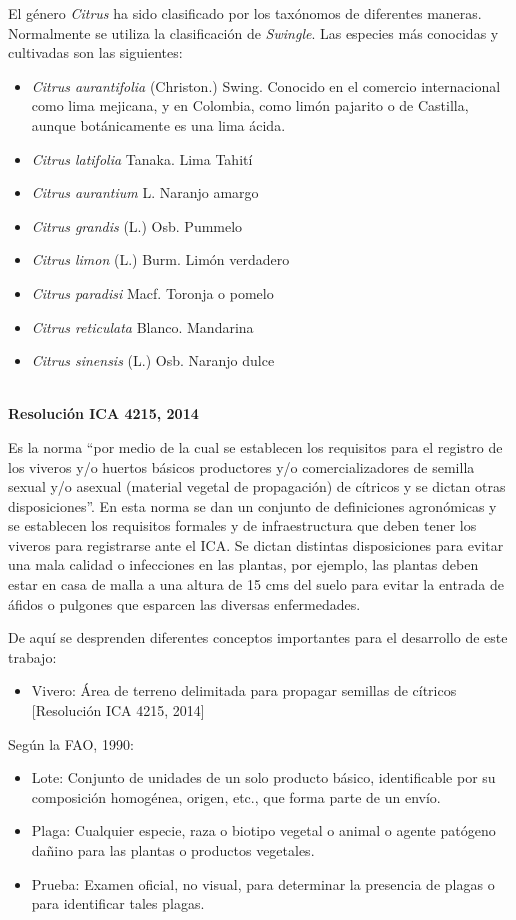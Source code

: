El g\'{e}nero \textit{Citrus} ha sido clasificado por los tax\'{o}nomos de diferentes maneras. Normalmente se utiliza la clasificaci\'{o}n de \textit{Swingle}. Las especies m\'{a}s conocidas y cultivadas son las siguientes: 
\begin{itemize}
\item \textit{Citrus aurantifolia} (Christon.) Swing. Conocido en el comercio internacional como lima mejicana, y en Colombia, como lim\'{o}n pajarito o de Castilla, aunque bot\'{a}nicamente es una lima \'{a}cida.
\item \textit{Citrus latifolia} Tanaka. Lima Tahit\'{i}
\item \textit{Citrus aurantium} L. Naranjo amargo
\item \textit{Citrus grandis} (L.) Osb. Pummelo
\item \textit{Citrus limon} (L.) Burm. Lim\'{o}n verdadero
\item \textit{Citrus paradisi} Macf. Toronja o pomelo
\item \textit{Citrus reticulata} Blanco. Mandarina
\item \textit{Citrus sinensis} (L.) Osb. Naranjo dulce
\end{itemize}

~\\\textbf{Resoluci\'{o}n ICA 4215, 2014}

Es la norma ``por medio de la cual se establecen los requisitos para el registro de los viveros y/o huertos b\'{a}sicos productores y/o comercializadores de semilla sexual y/o asexual (material vegetal de propagaci\'{o}n) de c\'{i}tricos y se dictan otras disposiciones''. En esta norma se dan un conjunto de definiciones agron\'{o}micas y se establecen los requisitos formales y de infraestructura que deben tener los viveros para registrarse ante el ICA. Se dictan distintas disposiciones para evitar una mala calidad o infecciones en las plantas, por ejemplo, las plantas deben estar en casa de malla a una altura de 15 cms del suelo para evitar la entrada de \'{a}fidos o pulgones que esparcen las diversas enfermedades.

De aqu\'{i} se desprenden diferentes conceptos importantes para el desarrollo de este trabajo:
\begin{itemize}
\item Vivero: \'{A}rea de terreno delimitada para propagar semillas de c\'{i}tricos [Resoluci\'{o}n ICA 4215, 2014]
\end{itemize}

Seg\'{u}n la FAO, 1990:
\begin{itemize}
\item Lote: Conjunto de unidades de un solo producto b\'{a}sico, identificable por su composici\'{o}n homog\'{e}nea, origen, etc., que forma parte de un env\'{i}o.
\item Plaga: Cualquier especie, raza o biotipo vegetal o animal o agente pat\'{o}geno da\~{n}ino para las plantas o productos vegetales.
\item Prueba: Examen oficial, no visual, para determinar la presencia de plagas o para identificar tales plagas. 
\end{itemize}

